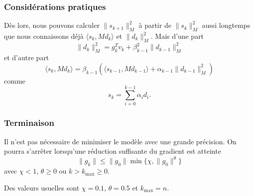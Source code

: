 \documentclass[usepdftitle=false]{beamer}
\begin{document}
\begin{frame}
\frametitle{Considérations pratiques}

Dès lors, nous pouvons calculer $\| s_{k+1} \|_M^2$ à partir de $\| s_k \|_M^2$ aussi longtemps que nous connaissons déjà $\langle s_k, Md_k \rangle$ et $\| d_k \|_M^2$.
Mais d'une part
$$
\| d_k \|_M^2 =  g_k^Tv_k + \beta_{k-1}^2 \| d_{k-1} \|_M^2	
$$
et d'autre part
$$
\langle s_k, Md_k \rangle = \beta_{k-1} \left( \langle s_{k-1}, Md_{k-1} \rangle + \alpha_{k-1} \| d_{k-1} \|_M^2 \right)
$$
comme
$$
s_k = \sum_{i = 0}^{k-1} \alpha_i d_i.
$$

\end{frame}

\begin{frame}
\frametitle{Terminaison}

Il n'est pas nécessaire de minimiser le modèle avec une grande précision.
On pourra s'arrêter lorsqu'une réduction suffisante du gradient est atteinte
$$
\| g_k \| \leq \| g_0 \| \min \lbrace \chi, \| g_0 \|^{\theta} \rbrace
$$
avec $\chi < 1$, $\theta \geq 0$ ou
$k > k_{\max} \geq 0$.

\mbox{}

Des valeurs usuelles sont $\chi = 0.1$, $\theta = 0.5$ et $k_{\max} = n$.
\end{frame}
\end{document}
